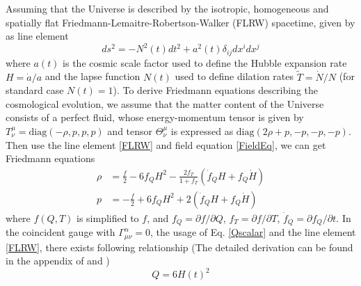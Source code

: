 \documentclass[a4paper,fleqn]{cas-sc}
\begin{document}
Assuming that the Universe is described by the isotropic, homogeneous and spatially flat Friedmann-Lemaitre-Robertson-Walker (FLRW) spacetime, given by as line element
\begin{equation}
    ds^2=-N^2(t)dt^2+a^2(t)\delta_{ij} dx^i dx^j\label{FLRW}
\end{equation}
where $a(t)$ is the cosmic scale factor
used to define the Hubble expansion rate $H=\dot{a}/a$ and the lapse function $N(t)$ used to define dilation rates $\tilde{T}=\dot{N}/N$ (for standard case $N(t)=1$). To derive Friedmann equations describing the cosmological evolution, we assume that the matter content of the Universe consists of a perfect fluid, whose  energy-momentum tensor is given by $T^{\mu}_\nu=\text{diag}(-\rho,p,p,p)$ and tensor $\Theta^{\mu}_\nu$ is expressed as $\text{diag}(2\rho+p,-p,-p,-p)$. Then use the line element \eqref{FLRW} and field equation \eqref{FieldEq}, we can get Friedmann equations
\begin{align}
    \rho &=\frac{f}{2}-6f_Q H^2-\frac{2f_T}{1+f_T}(\dot{f}_QH+f_Q \dot{H})\label{Fr1} \\
    p &=-\frac{f}{2}+6f_Q H^2+2(\dot{f}_QH+f_Q \dot{H})\label{Fr2} 
\end{align}
where $f(Q,T)$ is simplified to $f$, and $f_Q=\partial f/\partial Q$, $f_T=\partial f/\partial T$, $\dot{f}_Q=\partial f_Q/\partial t$. In the coincident gauge with $\Gamma^{\alpha}_{\mu\nu}=0$, the usage of Eq. \eqref{Qscalar} and the line element \eqref{FLRW}, there exists following relationship (The detailed derivation can be found in the appendix of \cite{Xu_2019} and \cite{lu2019cosmologysymmetricteleparallelgravity})
\begin{equation}
    Q=6H(t)^2
\end{equation}
\end{document}
